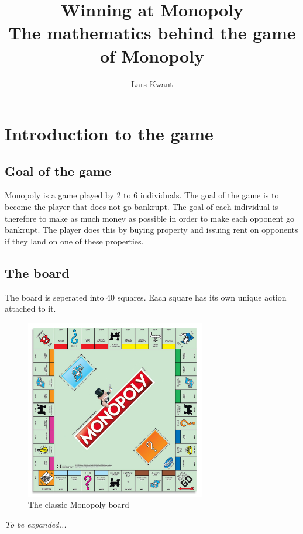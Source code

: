 \documentclass{article}
\title{Winning at Monopoly \\ \large The mathematics behind the game of Monopoly }
\author{Lars Kwant}
\begin{document}
\maketitle

\tableofcontents

\newpage

\section{Introduction to the game}
\subsection{Goal of the game}
Monopoly is a game played by 2 to 6 individuals. The goal of the game is to become the player that does not go bankrupt. The goal of each individual is therefore to make as much money as possible in order to make each opponent go bankrupt. The player does this by buying property and issuing rent on opponents if they land on one of these properties.\\

\subsection{The board}
The board is seperated into 40 squares. Each square has its own unique action attached to it. 
\begin{figure}[h]
\centering
\includegraphics[width = 0.7\textwidth]{images/board.jpg}
\caption{The classic Monopoly board \cite{mon_board_image}}
\end{figure}
\textit{To be expanded...}
\end{document}
